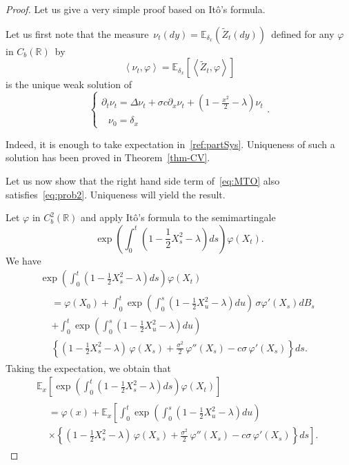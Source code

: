 \documentclass[10pt]{amsart}
\theoremstyle{definition}\newtheorem{defi}[theo]{Definition}\newtheorem{rema}[theo]{Remark}\newtheorem{exam}[theo]{Example}\newtheorem{exem}[theo]{Example}\newtheorem{nota}[theo]{Notation}
\newcommand*\R{\mathbb{R}}
\newcommand*\E{\mathbb{E}}
\begin{document}
\begin{proof}
Let us give a very simple proof based on It\^o's formula.


Let us first note that the measure $\,
\nu_{t}(dy)=\E_{\delta_{x}}(\widetilde{Z}_{t}(dy))\,$ defined for any $\varphi$ in $C_{b}(\R)$~by
\[
\left\langle\nu_{t}, \varphi \right\rangle =\E_{\delta_{x}}\left[\left\langle \widetilde{Z}_{t}, \varphi\right\rangle \right]
\]
is the unique weak solution of
\begin{equation}\label{eq:prob2}
\begin{cases}
\partial_{t}\nu_{t} =\Delta \nu_{t} + \sigma c \partial_{x}\nu_{t}+\left(1-\frac{x^2}{2}-\lambda\right)\nu_{t}\\
\;\;\,\nu_{0} =\delta_{x}
\end{cases}.
\end{equation}

Indeed, it is enough to take expectation in~\eqref{ref:partSys}. Uniqueness of such a solution has been proved in Theorem~\ref{thm-CV}.


Let us now show that the right hand side term of~\eqref{eq:MTO} also satisfies~\eqref{eq:prob2}. Uniqueness will yield the result.


Let $\varphi$ in $C^2_{b}(\R)$ and apply Itô's formula to the semimartingale
\[
\exp\left(\int_{0}^{t} \left(1-\frac{1}{2}X_{s}^{2}-\lambda \right)ds \right)\varphi(X_{t}).
\]
We have
\begin{multline*}
\exp\left(\int_{0}^{t} \left(1-\frac{1}{2}X_{s}^{2}-\lambda \right)ds \right)\varphi(X_{t})\\
\begin{aligned}
&= \varphi\left(X_{0}\right) + \int_{0}^t \exp\left(\int_{0}^{s} \left(1-\frac{1}{2}X_{u}^{2}-\lambda \right)du \right)\,\sigma\varphi'\left(X_{s}\right) dB_{s} \\
&+ \int_{0}^t \exp\left(\int_{0}^{s} \left(1-\frac{1}{2}X_{u}^{2}-\lambda \right)du \right) \\
&\left\{\left(1-\frac{1}{2}X_{s}^{2}-\lambda \right)\,\varphi\left(X_{s}\right) + \frac{\sigma^2}{2}\,\varphi''\left(X_{s}\right)- c \sigma\,\varphi'\left(X_{s}\right)\right\}ds.
\end{aligned}
\end{multline*}
Taking the expectation, we obtain that
\begin{multline} \label{ito}
\E_{x}\left[\exp\left(\int_{0}^{t} \left(1-\frac{1}{2} X_{s}^{2}-\lambda \right)ds \right)\varphi\left(X_{t}\right) \right]\\
\begin{aligned}
&=\varphi(x) + \E_{x}\left[\int_{0}^t \exp\left(\int_{0}^{s} \left(1-\frac{1}{2}X_{u}^{2}-\lambda \right)du \right) \right.\\
&\times\left. \left\{\left(1-\frac{1}{2}X_{s}^{2}-\lambda \right)\,\varphi\left(X_{s}\right) + \frac{\sigma^2}{2}\,\varphi''(X_{s})- c \sigma\,\varphi'\left(X_{s}\right)\right\}ds\right].
\end{aligned}
\end{multline}


\end{proof}
\end{document}
